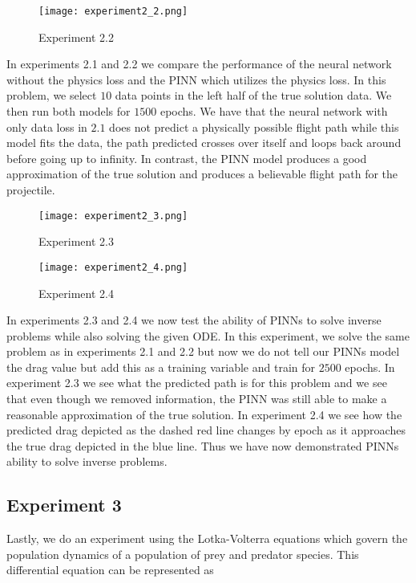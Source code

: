 \documentclass{article}
\begin{document}
\begin{figure}[H]
    \centering
    \texttt{[image: experiment2\_2.png]}
    \caption{Experiment 2.2}
\end{figure}

In experiments 2.1 and 2.2 we compare the performance of the neural network without the physics loss and the PINN which utilizes the physics loss. In this problem, we select $10$ data points in the left half of the true solution data. We then run both models for $1500$ epochs. We have that the neural network with only data loss in $2.1$ does not predict a physically possible flight path while this model fits the data, the path predicted crosses over itself and loops back around before going up to infinity. In contrast, the PINN model produces a good approximation of the true solution and produces a believable flight path for the projectile. 

\begin{figure}[H]
    \centering
    \texttt{[image: experiment2\_3.png]}
    \caption{Experiment 2.3}
\end{figure}

\begin{figure}[H]
    \centering
    \texttt{[image: experiment2\_4.png]}
    \caption{Experiment 2.4}
\end{figure}

In experiments 2.3 and 2.4 we now test the ability of PINNs to solve inverse problems while also solving the given ODE. In this experiment, we solve the same problem as in experiments 2.1 and 2.2 but now we do not tell our PINNs model the drag value but add this as a training variable and train for $2500$ epochs. In experiment 2.3 we see what the predicted path is for this problem and we see that even though we removed information, the PINN was still able to make a reasonable approximation of the true solution. In experiment 2.4 we see how the predicted drag depicted as the dashed red line changes by epoch as it approaches the true drag depicted in the blue line. Thus we have now demonstrated PINNs ability to solve inverse problems.

\subsection*{Experiment 3}

Lastly, we do an experiment using the Lotka-Volterra equations which govern the population dynamics of a population of prey and predator species. This differential equation can be represented as
\end{document}
